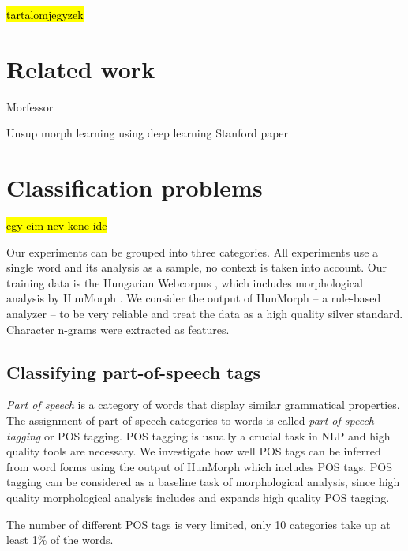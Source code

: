 \documentclass{article}
\begin{document}
\hl{tartalomjegyzek}

\section{Related work}\label{sec:related}

Morfessor

Unsup morph learning using deep learning Stanford paper

\section{Classification problems}

\hl{egy cim nev kene ide}

Our experiments can be grouped into three categories.
All experiments use a single word and its analysis as a sample, no context is taken into account.
Our training data is the Hungarian Webcorpus \cite{Halacsy:2004}, which includes morphological analysis by HunMorph \cite{Tron:2005}.
We consider the output of HunMorph -- a rule-based analyzer -- to be very reliable and treat the data as a high quality silver standard.
Character n-grams were extracted as features.

\subsection{Classifying part-of-speech tags}

\emph{Part of speech} is a category of words that display similar grammatical properties.
The assignment of part of speech categories to words is called \emph{part of speech tagging} or {POS tagging}.
POS tagging is usually a crucial task in NLP and high quality tools are necessary.
We investigate how well POS tags can be inferred from word forms using the output of HunMorph which includes POS tags.
POS tagging can be considered as a baseline task of morphological analysis, since high quality morphological analysis includes and expands high quality POS tagging.

The number of different POS tags is very limited, only 10 categories take up at least 1\% of the words.

\begin{table}
\end{table}
\end{document}
